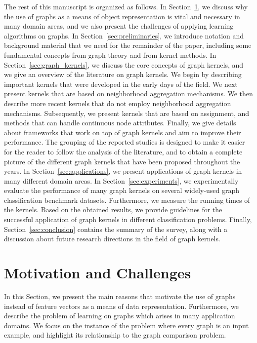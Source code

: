 \documentclass[twoside,11pt]{article}
\begin{document}
The rest of this manuscript is organized as follows.
In Section~\ref{sec:motivation_challenges}, we discuss why the use of graphs as a means of object representation is vital and necessary in many domain areas, and we also present the challenges of applying learning algorithms on graphs.
In Section~\ref{sec:preliminaries}, we introduce notation and background material that we need for the remainder of the paper, including some fundamental concepts from graph theory and from kernel methods.
In Section~\ref{sec:graph_kernels}, we discuss the core concepts of graph kernels, and we give an overview of the literature on graph kernels.
We begin by describing important kernels that were developed in the early days of the field.
We next present kernels that are based on neighborhood aggregation mechanisms.
We then describe more recent kernels that do not employ neighborhood aggregation mechanisms.
Subsequently, we present kernels that are based on assignment, and methods that can handle continuous node attributes.
Finally, we give details about frameworks that work on top of graph kernels and aim to improve their performance.
The grouping of the reported studies is designed to make it easier for the reader to follow the analysis of the literature, and to obtain a complete picture of the different graph kernels that have been proposed throughout the years.
In Section~\ref{sec:applications}, we present applications of graph kernels in many different domain areas.
In Section~\ref{sec:experiments}, we experimentally evaluate the performance of many graph kernels on several widely-used graph classification benchmark datasets.
Furthermore, we measure the running times of the kernels.
Based on the obtained results, we provide guidelines for the successful application of graph kernels in different classification problems.
Finally, Section~\ref{sec:conclusion} contains the summary of the survey, along with a discussion about future research directions in the field of graph kernels.

\section{Motivation and Challenges}\label{sec:motivation_challenges}
In this Section, we present the main reasons that motivate the use of graphs instead of feature vectors as a means of data representation.
Furthermore, we describe the problem of learning on graphs which arises in many application domains.
We focus on the instance of the problem where every graph is an input example, and highlight its relationship to the graph comparison problem.
\end{document}
